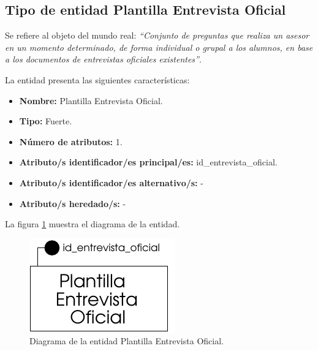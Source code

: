 \subsection{Tipo de entidad Plantilla Entrevista Oficial}

   \begin{description}

   \item[Definición] Se refiere al objeto del mundo real: \emph{``Conjunto de
   preguntas que realiza un asesor en un momento determinado, de forma
   individual o grupal a los alumnos, en base a los documentos de entrevistas
   oficiales existentes''}.

   \item[Características] La entidad presenta las siguientes características:
      \begin{itemize}
         \item \textbf{Nombre:} Plantilla Entrevista Oficial.
         \item \textbf{Tipo:} Fuerte.
         \item \textbf{Número de atributos:} 1.
         \item \textbf{Atributo/s identificador/es principal/es:} id\_entrevista\_oficial.
         \item \textbf{Atributo/s identificador/es alternativo/s:} -
         \item \textbf{Atributo/s heredado/s:} -
      \end{itemize}

   \item[Diagrama] La figura \ref{diagramaPlantEntOfi} muestra el diagrama de la entidad.
   \item \begin{figure}[!ht]
            \begin{center}
            \includegraphics[]{07.Modelo_Entidad-Interrelacion/7.2.Analisis_Entidades/diagramas/plant_ent_ofi.pdf}
            \caption{Diagrama de la entidad Plantilla Entrevista Oficial.}
            \label{diagramaPlantEntOfi}
            \end{center}
         \end{figure}


\end{description}
